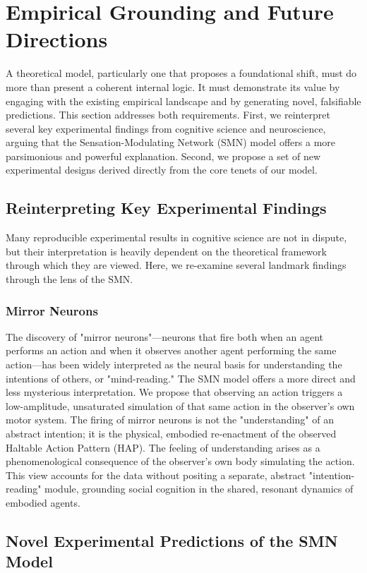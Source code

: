 \section{Empirical Grounding and Future Directions}
A theoretical model, particularly one that proposes a foundational shift, must do more than present a coherent internal logic. It must demonstrate its value by engaging with the existing empirical landscape and by generating novel, falsifiable predictions. This section addresses both requirements. First, we reinterpret several key experimental findings from cognitive science and neuroscience, arguing that the Sensation-Modulating Network (SMN) model offers a more parsimonious and powerful explanation. Second, we propose a set of new experimental designs derived directly from the core tenets of our model.

\subsection*{Reinterpreting Key Experimental Findings}
Many reproducible experimental results in cognitive science are not in dispute, but their interpretation is heavily dependent on the theoretical framework through which they are viewed. Here, we re-examine several landmark findings through the lens of the SMN.

\subsubsection*{Mirror Neurons}
The discovery of "mirror neurons"—neurons that fire both when an agent performs an action and when it observes another agent performing the same action—has been widely interpreted as the neural basis for understanding the intentions of others, or "mind-reading." The SMN model offers a more direct and less mysterious interpretation. We propose that observing an action triggers a low-amplitude, unsaturated simulation of that same action in the observer's own motor system. The firing of mirror neurons is not the "understanding" of an abstract intention; it is the physical, embodied re-enactment of the observed Haltable Action Pattern (HAP). The feeling of understanding arises as a phenomenological consequence of the observer's own body simulating the action. This view accounts for the data without positing a separate, abstract "intention-reading" module, grounding social cognition in the shared, resonant dynamics of embodied agents.

\subsection*{Novel Experimental Predictions of the SMN Model}
